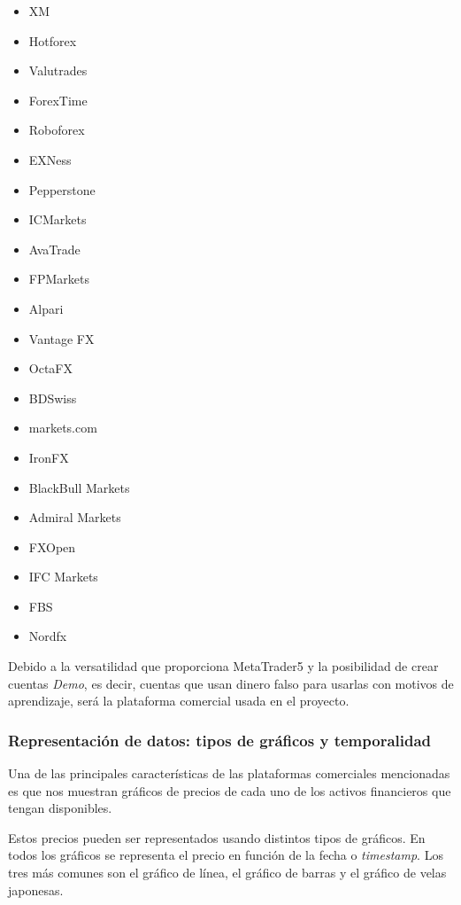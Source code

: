 \begin{multicols}{2}
	\begin{itemize}
		\item XM
		\item Hotforex
		\item Valutrades
		\item ForexTime
		\item Roboforex
		\item EXNess
		\item Pepperstone
		\item ICMarkets
		\item AvaTrade
		\item FPMarkets
		\item Alpari
		\item Vantage FX
		\item OctaFX
		\item BDSwiss
		\item markets.com
		\item IronFX
		\item BlackBull Markets
		\item Admiral Markets
		\item FXOpen
		\item IFC Markets
		\item FBS
		\item Nordfx
	\end{itemize}
\end{multicols}


Debido a la versatilidad que proporciona MetaTrader5 y la posibilidad de crear cuentas \textit{Demo}, es decir, cuentas que usan dinero falso para usarlas con motivos de aprendizaje, será la plataforma comercial usada en el proyecto.

\subsubsection{Representación de datos: tipos de gráficos y temporalidad}

Una de las principales características de las plataformas comerciales mencionadas es que nos muestran gráficos de precios de cada uno de los activos financieros que tengan disponibles. \newline

Estos precios pueden ser representados usando distintos tipos de gráficos. En todos los gráficos se representa el precio en función de la fecha o \textit{timestamp}. Los tres más comunes son el gráfico de línea, el gráfico de barras y el gráfico de velas japonesas. \newline

